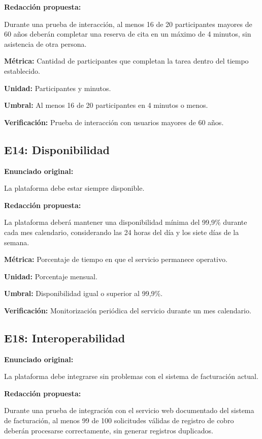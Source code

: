 \documentclass[12pt,a4paper]{article}
\begin{document}
\textbf{Redacción propuesta:}

Durante una prueba de interacción,
al menos 16 de 20 participantes
mayores de 60 años deberán completar
una reserva de cita en un máximo
de 4 minutos, sin asistencia
de otra persona.

\textbf{Métrica:}
Cantidad de participantes que completan
la tarea dentro del tiempo establecido.

\textbf{Unidad:}
Participantes y minutos.

\textbf{Umbral:}
Al menos 16 de 20 participantes
en 4 minutos o menos.

\textbf{Verificación:}
Prueba de interacción con usuarios
mayores de 60 años.

\subsection{E14: Disponibilidad}

\textbf{Enunciado original:}

La plataforma debe estar
siempre disponible.

\textbf{Redacción propuesta:}

La plataforma deberá mantener una
disponibilidad mínima del 99,9\%
durante cada mes calendario,
considerando las 24 horas del día
y los siete días de la semana.

\textbf{Métrica:}
Porcentaje de tiempo en que
el servicio permanece operativo.

\textbf{Unidad:}
Porcentaje mensual.

\textbf{Umbral:}
Disponibilidad igual o superior
al 99,9\%.

\textbf{Verificación:}
Monitorización periódica del servicio
durante un mes calendario.

\subsection{E18: Interoperabilidad}

\textbf{Enunciado original:}

La plataforma debe integrarse
sin problemas con el sistema de
facturación actual.

\textbf{Redacción propuesta:}

Durante una prueba de integración
con el servicio web documentado del
sistema de facturación, al menos
99 de 100 solicitudes válidas
de registro de cobro deberán
procesarse correctamente, sin
generar registros duplicados.
\end{document}
